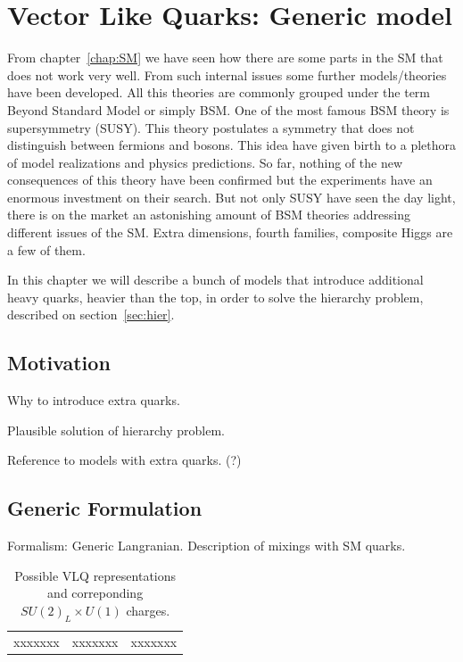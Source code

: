 \chapter[VLQ models]{Vector Like Quarks: Generic model}
\label{chap:VLQ}

From chapter~\ref{chap:SM} we have seen how there are some parts in the SM that does not work very well. From such internal issues some further models/theories have been developed. All this theories are commonly grouped under the term Beyond Standard Model or simply BSM. One of the most famous BSM theory is supersymmetry (SUSY). This theory postulates a symmetry that does not distinguish between fermions and bosons. This idea have given birth to a plethora of model realizations and physics predictions. So far, nothing of the new consequences of this theory have been confirmed but the experiments have an enormous investment on their search. But not only SUSY have seen the day light, there is on the market an astonishing amount of BSM theories addressing different issues of the SM. Extra dimensions, fourth families, composite Higgs are a few of them.

In this chapter we will describe a bunch of models that introduce additional heavy quarks, heavier than the top, in order to solve the hierarchy problem, described on section~\ref{sec:hier}. 

\section{Motivation}
\label{sec:motiv}

Why to introduce extra quarks.

Plausible solution of hierarchy problem.

Reference to models with extra quarks. (?)

\section{Generic Formulation}
\label{sec:form}

Formalism: Generic Langranian. Description of mixings with SM quarks.

\begin{table}[htbH]
\label{tab:VLQRepre}
\begin{center}
\begin{tabular}{|c|c|c|}
xxxxxxx & xxxxxxx & xxxxxxx
\end{tabular}
\caption{Possible VLQ representations and correponding $SU(2)_{L}\times U(1)$ charges.}
\end{center}
\end{table}

